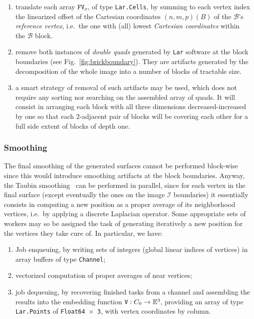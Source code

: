 \begin{enumerate}

\item translate each array $\mathtt{FV}_\sigma$, of type \texttt{Lar.Cells}, by summing to each vertex index the linearized offset of the Cartesian coordinates $(n,m,p)(B)$ of the $\mathcal{B}$'s \emph{reference vertex}, i.e.~the one with (all) lowest \emph{Cartesian coordinates} within the $\mathcal{B}$ block.

\item remove both instances of \emph{double quads} generated by \texttt{Lar} software at the block boundaries 
(see Fig.~\ref{fig:brickboundary}). 
They are artifacts generated by the decomposition of the whole image into a number of blocks of tractable size.

\item 
a smart strategy of removal of such artifacts may be used, which does not require any sorting nor searching on the assembled array of quads. It will consist in arranging each block with all three dimensions decreased-increased by one so that each 2-adjacent pair of blocks will be covering each other for a full side extent of blocks of depth one. 

\end{enumerate}

\subsubsection*{Smoothing}\label{sec:smoothing}
The final smoothing of the generated surfaces cannot be performed block-wise since this would introduce smoothing artifacts at the block boundaries. Anyway, the Taubin smoothing~\cite{Taubin1995} can be performed in parallel, since for each vertex in the final surface (except eventually the ones on the image $\mathcal{I}$ boundaries) it essentially consists in computing a new position as a proper average of its neighborhood vertices, i.e.~by applying a discrete Laplacian operator.  Some appropriate sets of workers may so be assigned the task of generating iteratively a new position for the vertices they take cure of. In particular, we have:
\begin{enumerate}

\item Job enqueuing, by writing sets of integers (global linear indices of vertices) in array buffers of type \texttt{Channel};

\item vectorized computation of proper averages of near vertices;

\item job dequeuing, by recovering finished tasks from a channel and assembling the results into the embedding function $\mathtt{V}: C_0 \to \mathbb{E}^3$, providing an array of type \texttt{Lar.Points} of \texttt{Float64 $\times$ 3}, with vertex coordinates by column.
\end{enumerate}




